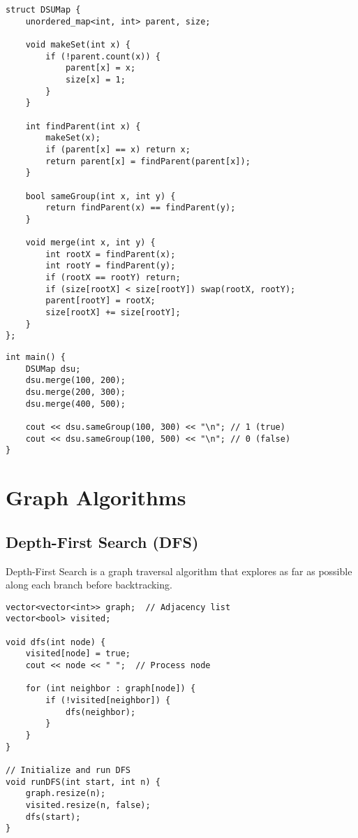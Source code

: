 \documentclass[11pt,a4paper]{article}
\begin{document}
\newpage
\begin{lstlisting}[caption={DSU with Unordered Map}]
struct DSUMap {
    unordered_map<int, int> parent, size;

    void makeSet(int x) {
        if (!parent.count(x)) {
            parent[x] = x;
            size[x] = 1;
        }
    }

    int findParent(int x) {
        makeSet(x);
        if (parent[x] == x) return x;
        return parent[x] = findParent(parent[x]);
    }

    bool sameGroup(int x, int y) {
        return findParent(x) == findParent(y);
    }

    void merge(int x, int y) {
        int rootX = findParent(x);
        int rootY = findParent(y);
        if (rootX == rootY) return;
        if (size[rootX] < size[rootY]) swap(rootX, rootY);
        parent[rootY] = rootX;
        size[rootX] += size[rootY];
    }
};
\end{lstlisting}

\begin{lstlisting}[caption={DSU Map Example Usage}]
int main() {
    DSUMap dsu;
    dsu.merge(100, 200);
    dsu.merge(200, 300);
    dsu.merge(400, 500);

    cout << dsu.sameGroup(100, 300) << "\n"; // 1 (true)
    cout << dsu.sameGroup(100, 500) << "\n"; // 0 (false)
}
\end{lstlisting}

\newpage

\section{Graph Algorithms}

\subsection{Depth-First Search (DFS)}
Depth-First Search is a graph traversal algorithm that explores as far as possible along each branch before backtracking.

\begin{lstlisting}[caption={DFS Implementation}]
vector<vector<int>> graph;  // Adjacency list
vector<bool> visited;

void dfs(int node) {
    visited[node] = true;
    cout << node << " ";  // Process node
    
    for (int neighbor : graph[node]) {
        if (!visited[neighbor]) {
            dfs(neighbor);
        }
    }
}

// Initialize and run DFS
void runDFS(int start, int n) {
    graph.resize(n);
    visited.resize(n, false);
    dfs(start);
}
\end{lstlisting}
\end{document}
